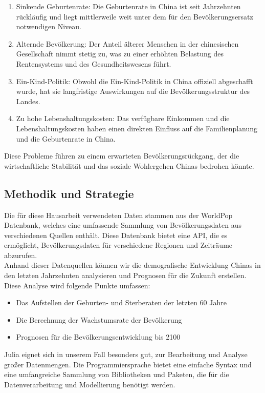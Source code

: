 \begin{enumerate}
\item Sinkende Geburtenrate: Die Geburtenrate in China ist seit Jahrzehnten rückläufig und liegt mittlerweile weit unter dem für den Bevölkerungsersatz notwendigen Niveau.
\item Alternde Bevölkerung: Der Anteil älterer Menschen in der chinesischen Gesellschaft nimmt stetig zu, was zu einer erhöhten Belastung des Rentensystems und des Gesundheitswesens führt.
\item Ein-Kind-Politik: Obwohl die Ein-Kind-Politik in China offiziell abgeschafft wurde, hat sie langfristige Auswirkungen auf die Bevölkerungsstruktur des Landes.
\item Zu hohe Lebenshaltungskosten: Das verfügbare Einkommen und die Lebenshaltungskosten haben einen direkten Einfluss auf die Familienplanung und die Geburtenrate in China.
\end{enumerate}
Diese Probleme führen zu einem erwarteten Bevölkerungsrückgang, der die wirtschaftliche Stabilität und das soziale Wohlergehen Chinas bedrohen könnte.

\subsection{Methodik und Strategie}

Die für diese Hausarbeit verwendeten Daten stammen aus der WorldPop Datenbank, welches eine umfassende Sammlung von Bevölkerungsdaten aus verschiedenen Quellen enthält. Diese Datenbank bietet eine API, die es ermöglicht, Bevölkerungsdaten für verschiedene Regionen und Zeiträume abzurufen.\\


Anhand dieser Datenquellen können wir die demografische Entwicklung Chinas in den letzten Jahrzehnten analysieren und Prognosen für die Zukunft erstellen.  Diese Analyse wird folgende Punkte umfassen:
\begin{itemize}
\item Das Aufstellen der Geburten- und Sterberaten der letzten 60 Jahre
\item Die Berechnung der Wachstumsrate der Bevölkerung
\item Prognosen für die Bevölkerungsentwicklung bis 2100
\end{itemize}


Julia eignet sich in unserem Fall besonders gut, zur Bearbeitung und Analyse großer Datenmengen. Die Programmiersprache bietet eine einfache Syntax und eine umfangreiche Sammlung von Bibliotheken und Paketen, die für die Datenverarbeitung und Modellierung benötigt werden.\\